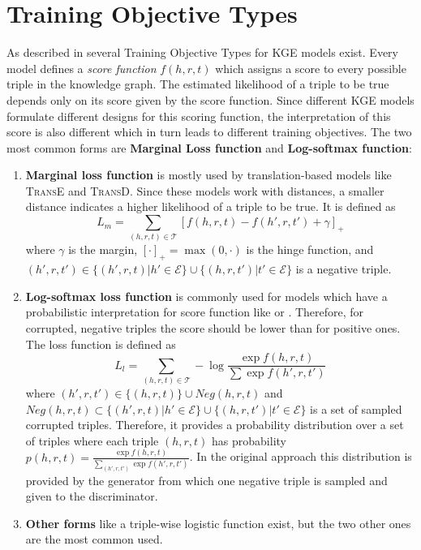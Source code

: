\section{Training Objective Types} 
\label{sec:training_objective_types}

As described in \cite{cai2017kbgan} several Training Objective Types for \ac{KGE} models exist.
Every model defines a \textit{score function} $f(h,r,t)$ which assigns a score to every possible triple in the knowledge graph.
The estimated likelihood of a triple to be true depends only on its score given by the score function.
Since different \ac{KGE} models formulate different designs for this scoring function, the interpretation of this score is also different which in turn leads to different training objectives.
The two most common forms are \textbf{Marginal Loss function} and \textbf{Log-softmax function}:
\begin{enumerate}
    \item 
    \textbf{Marginal loss function} is mostly used by translation-based models like \textsc{TransE} and \textsc{TransD}.
    Since these models work with distances, a smaller distance indicates a higher likelihood of a triple to be true.
    It is defined as 
    \begin{equation}
        L_{m}=\sum_{(h,r,t)\in\mathcal{T}}[f(h,r,t)-f(h',r,t')+\gamma]_+\label{eq:marginalloss}
    \end{equation}
    where $\gamma$ is the margin, $[\cdot]_+=\max(0,\cdot)$ is the hinge function, and $(h',r,t')\in\{(h',r,t)|h'\in\mathcal{E}\}\cup\{(h,r,t')|t'\in\mathcal{E}\}$ is a negative triple.
    
    \item \textbf{Log-softmax loss function} is commonly used for models which have a probabilistic interpretation for score function like \distmult or \complex.
    Therefore, for corrupted, negative triples the score should be lower than for positive ones.
    The loss function is defined as
    \begin{equation} \label{eq:nllloss}
        L_{l}=\sum_{(h,r,t)\in\mathcal{T}}-\log \frac{\exp f(h,r,t)}{\sum\exp f(h',r,t')}
    \end{equation}
    where $(h',r,t')\in\{(h,r,t)\}\cup Neg(h,r,t)$ and $Neg(h,r,t)\subset\{(h',r,t)|h'\in\mathcal{E}\}\cup\{(h,r,t')|t'\in\mathcal{E}\}$ is a set of sampled corrupted triples.
    Therefore, it provides a probability distribution over a set of triples where each triple $(h, r, t)$ has probability $p(h,r,t)=\frac{\exp f(h,r,t)}{\sum_{(h',r,t')}\exp f(h',r,t')}$.
    In the original \kbgan approach this distribution is provided by the generator from which one negative triple is sampled and given to the discriminator.
    
    \item 
    \textbf{Other forms} like a triple-wise logistic function \cite{ConvE} exist, but the two other ones are the most common used.
\end{enumerate}





